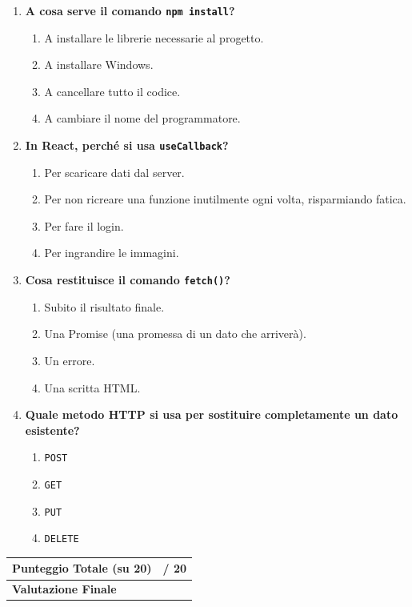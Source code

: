 \documentclass[11pt,a4paper]{article}
\begin{document}
\begin{enumerate}[label=\textbf{\arabic*.}, leftmargin=1.5em, itemsep=1.5em]
    \item \textbf{A cosa serve il comando \texttt{npm install}?}
    \begin{enumerate}[label=\alph*)]
        \item A installare le librerie necessarie al progetto.
        \item A installare Windows.
        \item A cancellare tutto il codice.
        \item A cambiare il nome del programmatore.
    \end{enumerate}

    \item \textbf{In React, perché si usa \texttt{useCallback}?}
    \begin{enumerate}[label=\alph*)]
        \item Per scaricare dati dal server.
        \item Per non ricreare una funzione inutilmente ogni volta, risparmiando fatica.
        \item Per fare il login.
        \item Per ingrandire le immagini.
    \end{enumerate}

    \item \textbf{Cosa restituisce il comando \texttt{fetch()}?}
    \begin{enumerate}[label=\alph*)]
        \item Subito il risultato finale.
        \item Una Promise (una promessa di un dato che arriverà).
        \item Un errore.
        \item Una scritta HTML.
    \end{enumerate}

    \item \textbf{Quale metodo HTTP si usa per sostituire completamente un dato esistente?}
    \begin{enumerate}[label=\alph*)]
        \item \texttt{POST}
        \item \texttt{GET}
        \item \texttt{PUT}
        \item \texttt{DELETE}
    \end{enumerate}

\end{enumerate}

\vspace{1cm}
\begin{center}
\begin{tabular}{|l|l|}
\hline
\textbf{Punteggio Totale (su 20)} & \hspace{3cm} / 20 \\ \hline
\textbf{Valutazione Finale} & \hspace{3cm} \\ \hline
\end{tabular}
\end{center}
\end{document}
